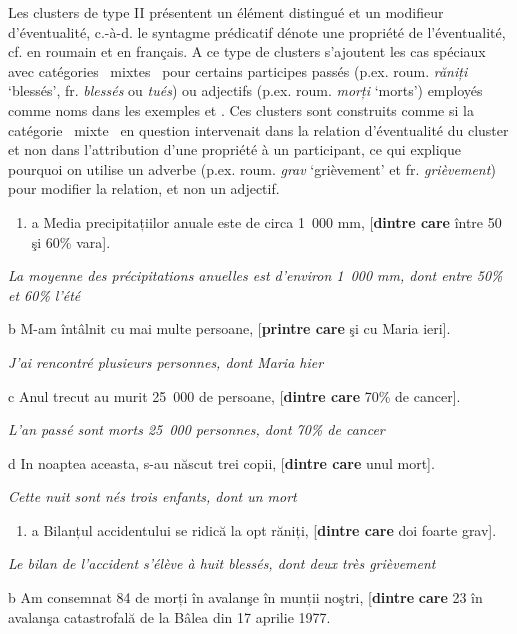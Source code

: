 Les clusters de type II présentent un élément distingué et un modifieur d'éventualité, c.-à-d. le syntagme prédicatif dénote une propriété de l'éventualité, cf.  en roumain et  en français. A ce type de clusters s'ajoutent les cas spéciaux avec catégories {\guillemotleft}~mixtes~{\guillemotright} pour certains participes passés (p.ex. roum. \textit{răniți} `blessés', fr. \textit{blessés} ou \textit{tués}) ou adjectifs (p.ex. roum. \textit{morți} `morts') employés comme noms dans les exemples  et . Ces clusters sont construits comme si la catégorie {\guillemotleft}~mixte~{\guillemotright} en question intervenait dans la relation d'éventualité du cluster et non dans l'attribution d'une propriété à un participant, ce qui explique pourquoi on utilise un adverbe (p.ex. roum. \textit{grav} `grièvement' et fr. \textit{grièvement}) pour modifier la relation, et non un adjectif.  


\begin{enumerate}
\item \label{bkm:Ref293337225}a  Media precipitațiilor anuale este de circa 1~000 mm, [\textbf{dintre care} între 50 şi 60\% vara].  


\end{enumerate}
{\itshape
La moyenne des précipitations anuelles est d'environ 1~000 mm, dont entre 50\% et 60\% l'été}

  b  M-am întâlnit cu mai multe persoane, [\textbf{printre care} şi cu Maria ieri].

    \textit{J'ai rencontré plusieurs personnes, dont Maria hier}

  c  Anul trecut au murit 25~000 de persoane, [\textbf{dintre care} 70\% de cancer].

    \textit{L'an passé sont morts 25~000 personnes, dont 70\% de cancer} 

  d  In noaptea aceasta, s-au născut trei copii, [\textbf{dintre care} unul mort].

    \textit{Cette nuit sont nés trois enfants, dont un mort}


\begin{enumerate}
\item \label{bkm:Ref293351070}a  Bilanțul accidentului se ridică la opt răniți, [\textbf{dintre care} doi foarte grav].  


\end{enumerate}
{\itshape
Le bilan de l'accident s'élève à huit blessés, dont deux très grièvement}

  b  Am consemnat 84 de morți în avalanşe în munții noştri, [\textbf{dintre} \textbf{care} 23 în avalanşa catastrofală de la Bâlea din 17 aprilie 1977.

